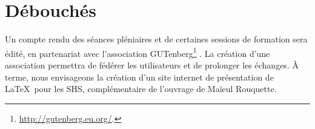 \documentclass[11pt]{article}
\begin{document}
\section{Débouchés}

Un compte rendu des séances pléniaires et de certaines sessions de formation sera édité, en partenariat avec l'association GUTenberg\footnote{\url{http://gutenberg.eu.org/}.} . 
La création d'une association permettra de fédérer les utilisateurs et de prolonger les échanges. 
À terme, nous envisageons la création d'un site internet de présentation de \LaTeX\ pour les SHS, complémentaire de l'ouvrage de Maïeul Rouquette. 
\end{document}
